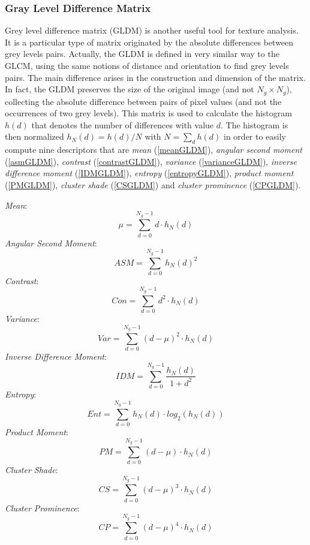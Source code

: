 \subsubsection{Gray Level Difference Matrix} \label{GLDM}
Grey level difference matrix (\acs{GLDM})\cite{Conners} is another useful tool for texture analysis. It is a particular type of matrix originated by the absolute differences between grey levels pairs. Actually, the GLDM is defined in very similar way to the GLCM, using the same notions of distance and orientation to find grey levels pairs. The main difference arises in the construction and dimension of the matrix. In fact, the GLDM preserves the size of the original image (and not $N_{g} \times N_{g}$), collecting the absolute difference between pairs of pixel values (and not the occurrences of two grey levels). This matrix is used to calculate the histogram $h(d)$ that denotes the number of differences with value $d$. The histogram is then normalized $h_N(d)=h(d)/N $ with $N = \sum_{d} h(d)$ in order to easily compute nine descriptors that are \textit{mean} (\ref {meanGLDM}), \textit{angular second moment} (\ref{asmGLDM}), \textit{contrast} (\ref{contrastGLDM}), \textit{variance} (\ref{varianceGLDM}), \textit{inverse difference moment} (\ref{IDMGLDM}),  \textit{entropy} (\ref {entropyGLDM}), \textit{product moment} (\ref {PMGLDM}), \textit{cluster shade} (\ref{CSGLDM}) and \textit{cluster prominence} (\ref {CPGLDM}). 

\noindent\textit{Mean}:
\begin{equation}\label{meanGLDM}
\mu=\sum_{d=0}^{N_{g}-1} d \cdot h_N(d)
\end{equation}
\textit{Angular Second Moment}:
\begin{equation}\label{asmGLDM}
ASM=\sum_{d=0}^{N_{g}-1} h_N(d)^2
\end{equation}
\textit{Contrast}:
\begin{equation}\label{contrastGLDM}
Con=\sum_{d=0}^{N_{g}-1} d^2 \cdot h_N(d)
\end{equation}
\textit{Variance}:
\begin{equation}\label{varianceGLDM}
Var=\sum_{d=0}^{N_{g}-1} (d - \mu)^2 \cdot h_N(d)
\end{equation}
\textit{Inverse Difference Moment}:
\begin{equation}\label{IDMGLDM}
IDM=\sum_{d=0}^{N_{g}-1}  \frac{h_N(d)}{1 + d^2}
\end{equation}
\textit{Entropy}:
\begin{equation}\label{entropyGLDM}
Ent=\sum_{d=0}^{N_{g}-1} h_N(d) \cdot log_2(h_N(d))
\end{equation}
\textit{Product Moment}:
\begin{equation}\label{PMGLDM}
PM=\sum_{d=0}^{N_{g}-1}  (d - \mu) \cdot h_N(d)
\end{equation}
\textit{Cluster Shade}:
\begin{equation}\label{CSGLDM}
CS=\sum_{d=0}^{N_{g}-1}  (d - \mu)^3 \cdot h_N(d)
\end{equation}
\textit{Cluster Prominence}:
\begin{equation}\label{CPGLDM}
CP=\sum_{d=0}^{N_{g}-1}  (d - \mu)^4 \cdot h_N(d)
\end{equation}

